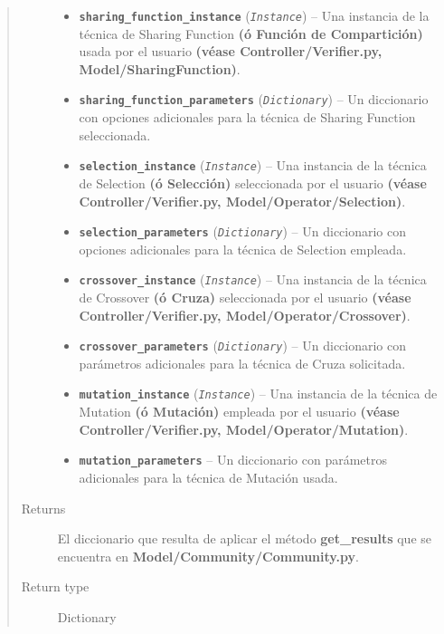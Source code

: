 \documentclass[letterpaper,10pt,english]{sphinxmanual}
\begin{document}
\begin{fulllineitems}
\begin{quote}
\begin{description}
\begin{itemize}
\item {} 
\textbf{\texttt{sharing\_function\_instance}} (\emph{\texttt{Instance}}) -- Una instancia de la técnica de Sharing Function \textbf{(ó Función de Compartición)} usada
por el usuario \textbf{(véase Controller/Verifier.py, Model/SharingFunction)}.

\item {} 
\textbf{\texttt{sharing\_function\_parameters}} (\emph{\texttt{Dictionary}}) -- Un diccionario con opciones adicionales para la técnica de Sharing Function seleccionada.

\item {} 
\textbf{\texttt{selection\_instance}} (\emph{\texttt{Instance}}) -- Una instancia de la técnica de Selection \textbf{(ó Selección)} seleccionada por el usuario
\textbf{(véase Controller/Verifier.py, Model/Operator/Selection)}.

\item {} 
\textbf{\texttt{selection\_parameters}} (\emph{\texttt{Dictionary}}) -- Un diccionario con opciones adicionales para la técnica de Selection empleada.

\item {} 
\textbf{\texttt{crossover\_instance}} (\emph{\texttt{Instance}}) -- Una instancia de la técnica de Crossover \textbf{(ó Cruza)} seleccionada por el usuario
\textbf{(véase Controller/Verifier.py, Model/Operator/Crossover)}.

\item {} 
\textbf{\texttt{crossover\_parameters}} (\emph{\texttt{Dictionary}}) -- Un diccionario con parámetros adicionales para la técnica de Cruza solicitada.

\item {} 
\textbf{\texttt{mutation\_instance}} (\emph{\texttt{Instance}}) -- Una instancia de la técnica de Mutation \textbf{(ó Mutación)} empleada por el usuario
\textbf{(véase Controller/Verifier.py, Model/Operator/Mutation)}.

\item {} 
\textbf{\texttt{mutation\_parameters}} -- Un diccionario con parámetros adicionales para la técnica de Mutación usada.

\end{itemize}

\item[{Returns}] \leavevmode
El diccionario que resulta de aplicar el método \textbf{get\_results} que se encuentra en \textbf{Model/Community/Community.py}.

\item[{Return type}] \leavevmode
Dictionary

\end{description}\end{quote}

\end{fulllineitems}
\end{document}
